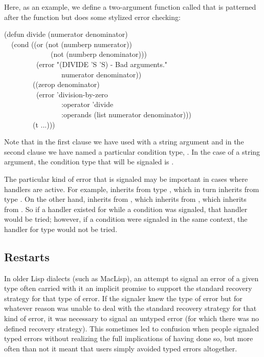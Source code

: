 Here, as an example,
we define a two-argument function called  that is patterned after
the \cd{/} function but does some stylized error checking:
\begin{lisp}
(defun divide (numerator denominator) \\
~~(cond ((or (not (numberp numerator)) \\
~~~~~~~~~~~~~(not (numberp denominator))) \\
~~~~~~~~~(error "(DIVIDE '{\Xtilde}S '{\Xtilde}S) - Bad arguments." \\
~~~~~~~~~~~~~~~~numerator denominator)) \\
~~~~~~~~((zerop denominator) \\
~~~~~~~~~(error 'division-by-zero \\
~~~~~~~~~~~~~~~~:operator 'divide \\
~~~~~~~~~~~~~~~~:operands (list numerator denominator))) \\
~~~~~~~~(t ...)))
\end{lisp}
Note that in the first clause we have used  with a string argument
and in the second clause we have named a particular condition type,
. In the case of a string argument, the condition type that
will be signaled is .

The particular kind of error that is signaled may be important
in cases where handlers are active. For example,  inherits 
from type , which in turn inherits from type . On the 
other hand,  inherits from , which 
inherits from , which inherits from . So if a handler
existed for  while a  condition was
signaled, that handler would be tried; however, if a 
condition were signaled in the same context, the handler for type
 would not be tried.


\subsection{Restarts}
\label{RESTARTS}

In older Lisp dialects (such as MacLisp), an attempt to signal an error of a
given type often carried with it an implicit promise to support the standard
recovery strategy for that type of error. If the signaler knew the type of
error but for whatever reason was unable to deal with the standard recovery
strategy for that kind of error, it was necessary to signal an untyped error
(for which there was no defined recovery strategy). This sometimes led to
confusion when people signaled typed errors without realizing the full
implications of having done so, but more often than not it meant that users
simply avoided typed errors altogether.

